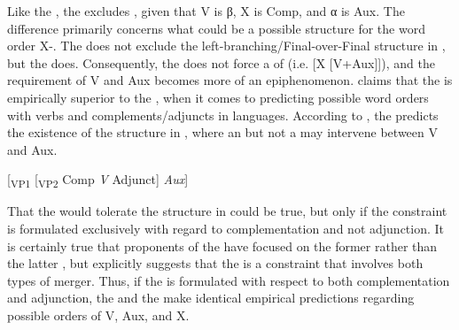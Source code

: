 \documentclass[output=paper, colorlinks, citecolor=brown]{langscibook}
\begin{document}
Like the , the  excludes , given that V is β, X is Comp, and α is Aux. The difference primarily concerns what could be a possible structure for the word order X-. The  does not exclude the left-branching/Final-over-Final structure in , but the  does. Consequently, the  does not force a  of  (i.e. [X [V+Aux]]), and the  requirement of V and Aux becomes more of an epiphenomenon. \citet[132--133]{Haider2013} claims that the  is empirically superior to the , when it comes to predicting possible word orders with verbs and complements\slash adjuncts in  languages. According to \citet[133]{Haider2013}, the  predicts the existence of the structure in , where an  but not a  may intervene between V and Aux.


\ea {}[\textsubscript{VP1} [\textsubscript{VP2} {Comp} \textit{V} {Adjunct}] \textit{Aux}]\label{ex:sangfelt:10}\z


That the  would tolerate the structure in  could be true, but only if the constraint is formulated exclusively with regard to complementation and not adjunction. It is certainly true that proponents of the  have focused on the former rather than the latter \citep[97]{Sheehan2017Final}, but \citet{Sheehan2017Final} explicitly suggests that the  is a constraint that involves both types of merger. Thus, if the  is formulated with respect to both complementation and adjunction, the  and the  make identical empirical predictions regarding possible orders of V, Aux, and X.
\end{document}
